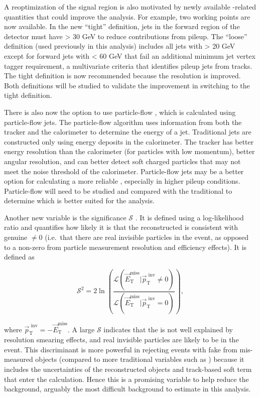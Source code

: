 A reoptimization of the signal region is also motivated by newly available \etmiss-related quantities that could improve the \monoZ analysis. For example, two \etmiss working points are now available. In the new ``tight'' \etmiss definition, jets in the forward region of the detector must have \pt > 30 GeV to reduce contributions from pileup. The ``loose'' definition (used previously in this analysis) includes all jets with \pt > 20 GeV except for forward jets with \pt < 60 GeV that fail an additional minimum jet vertex tagger requirement, a multivariate criteria that identifies pileup jets from tracks. The tight definition is now recommended because the \etmiss resolution is improved. Both definitions will be studied to validate the improvement in switching to the tight definition.

There is also now the option to use particle-flow \etmiss, which is calculated using particle-flow jets. The particle-flow algorithm \cite{Sirunyan:2017ulk} uses information from both the tracker and the calorimeter to determine the energy of a jet. Traditional jets are constructed only using energy deposits in the calorimeter. The tracker has better energy resolution than the calorimeter (for particles with low momentum), better angular resolution, and can better detect soft charged particles that may not meet the noise threshold of the calorimeter. Particle-flow jets may be a better option for calculating a more reliable \etmiss, especially in higher pileup conditions. Particle-flow \etmiss will need to be studied and compared with the traditional \etmiss to determine which is better suited for the analysis.

Another new variable is the \etmiss significance $\mathcal{S}$ \cite{Schaefer:2294922}. It is defined using a log-likelihood ratio and quantifies how likely it is that the reconstructed \etmissvec is consistent with genuine \etmissvec $\neq 0$ (i.e.\ that there are real invisible particles in the event, as opposed to a non-zero \etmissvec from particle measurement resolution and efficiency effects). It is defined as

\begin{equation}
\mathcal{S}^2 = 2 \ln \left( \frac{\mathcal{L}(\vec{E}_\text{T}^\text{miss} | \vec{p}_\text{T}^\text{ inv} \neq 0)}{\mathcal{L}(\vec{E}_\text{T}^\text{miss} | \vec{p}_\text{T}^\text{ inv} = 0)} \right),
\end{equation}

\noindent where $\vec{p}_\text{T}^\text{ inv} = -\vec{E}_\text{T}^\text{miss}$. A large $\mathcal{S}$ indicates that the \etmissvec is not well explained by resolution smearing effects, and real invisible particles are likely to be in the event. This discriminant is more powerful in rejecting events with fake \etmiss from mis-measured objects (compared to more traditional variables such as \etmissht) because it includes the uncertainties of the reconstructed objects and track-based soft term that enter the \etmiss calculation. Hence this is a promising variable to help reduce the \Zjets background, arguably the most difficult background to estimate in this analysis.

